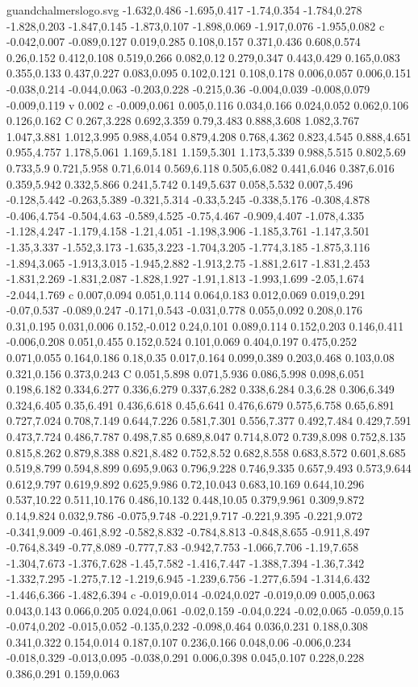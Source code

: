 \begin{filecontents}[noheader]{guandchalmerslogo.svg}
-1.632,0.486 -1.695,0.417 -1.74,0.354 -1.784,0.278 -1.828,0.203 -1.847,0.145 -1.873,0.107 -1.898,0.069 -1.917,0.076 -1.955,0.082 c -0.042,0.007 -0.089,0.127 0.019,0.285 0.108,0.157 0.371,0.436 0.608,0.574 0.26,0.152 0.412,0.108 0.519,0.266 0.082,0.12 0.279,0.347 0.443,0.429 0.165,0.083 0.355,0.133 0.437,0.227 0.083,0.095 0.102,0.121 0.108,0.178 0.006,0.057 0.006,0.151 -0.038,0.214 -0.044,0.063 -0.203,0.228 -0.215,0.36 -0.004,0.039 -0.008,0.079 -0.009,0.119 v 0.002 c -0.009,0.061 0.005,0.116 0.034,0.166 0.024,0.052 0.062,0.106 0.126,0.162 C 0.267,3.228 0.692,3.359 0.79,3.483 0.888,3.608 1.082,3.767 1.047,3.881 1.012,3.995 0.988,4.054 0.879,4.208 0.768,4.362 0.823,4.545 0.888,4.651 0.955,4.757 1.178,5.061 1.169,5.181 1.159,5.301 1.173,5.339 0.988,5.515 0.802,5.69 0.733,5.9 0.721,5.958 0.71,6.014 0.569,6.118 0.505,6.082 0.441,6.046 0.387,6.016 0.359,5.942 0.332,5.866 0.241,5.742 0.149,5.637 0.058,5.532 0.007,5.496 -0.128,5.442 -0.263,5.389 -0.321,5.314 -0.33,5.245 -0.338,5.176 -0.308,4.878 -0.406,4.754 -0.504,4.63 -0.589,4.525 -0.75,4.467 -0.909,4.407 -1.078,4.335 -1.128,4.247 -1.179,4.158 -1.21,4.051 -1.198,3.906 -1.185,3.761 -1.147,3.501 -1.35,3.337 -1.552,3.173 -1.635,3.223 -1.704,3.205 -1.774,3.185 -1.875,3.116 -1.894,3.065 -1.913,3.015 -1.945,2.882 -1.913,2.75 -1.881,2.617 -1.831,2.453 -1.831,2.269 -1.831,2.087 -1.828,1.927 -1.91,1.813 -1.993,1.699 -2.05,1.674 -2.044,1.769 c 0.007,0.094 0.051,0.114 0.064,0.183 0.012,0.069 0.019,0.291 -0.07,0.537 -0.089,0.247 -0.171,0.543 -0.031,0.778 0.055,0.092 0.208,0.176 0.31,0.195 0.031,0.006 0.152,-0.012 0.24,0.101 0.089,0.114 0.152,0.203 0.146,0.411 -0.006,0.208 0.051,0.455 0.152,0.524 0.101,0.069 0.404,0.197 0.475,0.252 0.071,0.055 0.164,0.186 0.18,0.35 0.017,0.164 0.099,0.389 0.203,0.468 0.103,0.08 0.321,0.156 0.373,0.243 C 0.051,5.898 0.071,5.936 0.086,5.998 0.098,6.051 0.198,6.182 0.334,6.277 0.336,6.279 0.337,6.282 0.338,6.284 0.3,6.28 0.306,6.349 0.324,6.405 0.35,6.491 0.436,6.618 0.45,6.641 0.476,6.679 0.575,6.758 0.65,6.891 0.727,7.024 0.708,7.149 0.644,7.226 0.581,7.301 0.556,7.377 0.492,7.484 0.429,7.591 0.473,7.724 0.486,7.787 0.498,7.85 0.689,8.047 0.714,8.072 0.739,8.098 0.752,8.135 0.815,8.262 0.879,8.388 0.821,8.482 0.752,8.52 0.682,8.558 0.683,8.572 0.601,8.685 0.519,8.799 0.594,8.899 0.695,9.063 0.796,9.228 0.746,9.335 0.657,9.493 0.573,9.644 0.612,9.797 0.619,9.892 0.625,9.986 0.72,10.043 0.683,10.169 0.644,10.296 0.537,10.22 0.511,10.176 0.486,10.132 0.448,10.05 0.379,9.961 0.309,9.872 0.14,9.824 0.032,9.786 -0.075,9.748 -0.221,9.717 -0.221,9.395 -0.221,9.072 -0.341,9.009 -0.461,8.92 -0.582,8.832 -0.784,8.813 -0.848,8.655 -0.911,8.497 -0.764,8.349 -0.77,8.089 -0.777,7.83 -0.942,7.753 -1.066,7.706 -1.19,7.658 -1.304,7.673 -1.376,7.628 -1.45,7.582 -1.416,7.447 -1.388,7.394 -1.36,7.342 -1.332,7.295 -1.275,7.12 -1.219,6.945 -1.239,6.756 -1.277,6.594 -1.314,6.432 -1.446,6.366 -1.482,6.394 c -0.019,0.014 -0.024,0.027 -0.019,0.09 0.005,0.063 0.043,0.143 0.066,0.205 0.024,0.061 -0.02,0.159 -0.04,0.224 -0.02,0.065 -0.059,0.15 -0.074,0.202 -0.015,0.052 -0.135,0.232 -0.098,0.464 0.036,0.231 0.188,0.308 0.341,0.322 0.154,0.014 0.187,0.107 0.236,0.166 0.048,0.06 -0.006,0.234 -0.018,0.329 -0.013,0.095 -0.038,0.291 0.006,0.398 0.045,0.107 0.228,0.228 0.386,0.291 0.159,0.063 
\end{filecontents}
